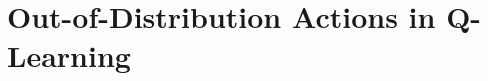 \vspace{-0.2cm}
\section{Out-of-Distribution Actions in Q-Learning}
\label{sec:bear_problem}
\vspace{-0.2cm}


